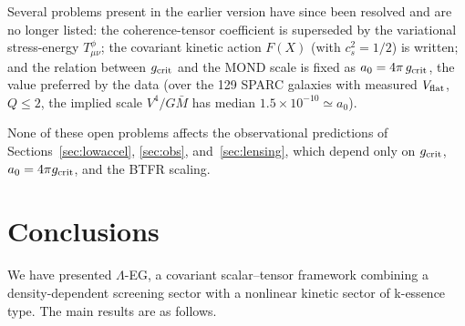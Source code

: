 \documentclass[11pt,a4paper]{article}
\begin{document}
Several problems present in the earlier version have since been resolved and are no
longer listed: the coherence-tensor coefficient is superseded by the variational
stress-energy $T^\phi_{\mu\nu}$; the covariant kinetic action $F(X)$ (with
$c_s^2 = 1/2$) is written; and the relation between $g_{\rm crit}$ and the MOND scale is
fixed as $a_0 = 4\pi\,g_{\rm crit}$, the value preferred by the data (over the 129 SPARC
galaxies with measured $V_{\rm flat}$, $Q\le2$, the implied scale $V^4/G\bar{M}$ has
median $1.5\times10^{-10}\simeq a_0$).

None of these open problems affects the observational predictions of
Sections~\ref{sec:lowaccel}, \ref{sec:obs}, and~\ref{sec:lensing}, which depend only on
$g_{\rm crit}$, $a_0 = 4\pi g_{\rm crit}$, and the BTFR scaling.

\section{Conclusions}
\label{sec:conclusions}

We have presented $\Lambda$-EG, a covariant scalar--tensor framework combining a
density-dependent screening sector with a nonlinear kinetic sector of k-essence type.
The main results are as follows.
\end{document}
